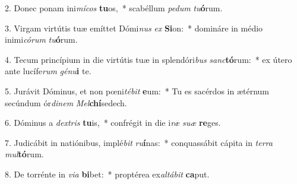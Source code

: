 2. Donec ponam ini\textit{mí}\textit{cos} \textbf{tu}os,~*  scabéllum \textit{pe}\textit{dum} \textit{tu}\textbf{ó}rum.\

3. Virgam virtútis tuæ emíttet Dómi\textit{nus} \textit{ex} \textbf{Si}on:~*  domináre in médio inimi\textit{có}\textit{rum} \textit{tu}\textbf{ó}rum.\

4. Tecum princípium in die virtútis tuæ in splendóri\textit{bus} \textit{sanc}\textbf{tó}rum:~*  ex útero ante lucífe\textit{rum} \textit{gé}\textit{nu}\textbf{i} te.\

5. Jurávit Dóminus, et non pœni\textit{té}\textit{bit} \textbf{e}um:~*  Tu es sacérdos in ætérnum secúndum ór\textit{di}\textit{nem} \textit{Mel}\textbf{chí}sedech.\

6. Dóminus a \textit{dex}\textit{tris} \textbf{tu}is,~*  confrégit in die i\textit{ræ} \textit{su}\textit{æ} \textbf{re}ges.\

7. Judicábit in natiónibus, implé\textit{bit} \textit{ru}\textbf{í}nas:~*  conquassábit cápita in \textit{ter}\textit{ra} \textit{mul}\textbf{tó}rum.\

8. De torrénte in \textit{vi}\textit{a} \textbf{bi}bet:~*  proptérea ex\textit{al}\textit{tá}\textit{bit} \textbf{ca}put.\

